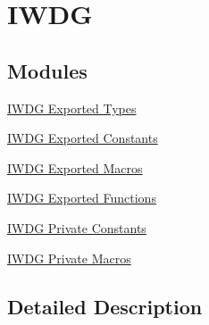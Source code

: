 \hypertarget{group___i_w_d_g}{}\section{I\+W\+DG}
\label{group___i_w_d_g}
\subsection*{Modules}
\begin{DoxyCompactItemize}
\item 
\hyperlink{group___i_w_d_g___exported___types}{I\+W\+D\+G Exported Types}
\item 
\hyperlink{group___i_w_d_g___exported___constants}{I\+W\+D\+G Exported Constants}
\item 
\hyperlink{group___i_w_d_g___exported___macros}{I\+W\+D\+G Exported Macros}
\item 
\hyperlink{group___i_w_d_g___exported___functions}{I\+W\+D\+G Exported Functions}
\item 
\hyperlink{group___i_w_d_g___private___constants}{I\+W\+D\+G Private Constants}
\item 
\hyperlink{group___i_w_d_g___private___macros}{I\+W\+D\+G Private Macros}
\end{DoxyCompactItemize}


\subsection{Detailed Description}
